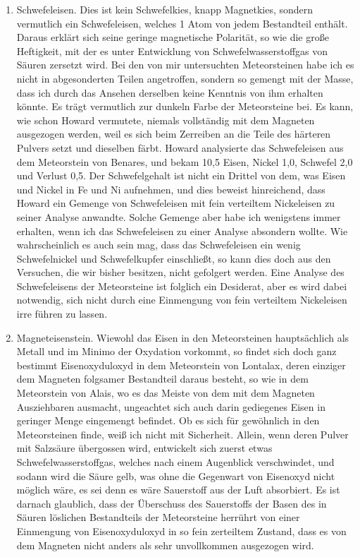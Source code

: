 \documentclass[a4paper, 11pt, oneside]{article}
\begin{document}
\begin{enumerate}
    \item Schwefeleisen. Dies ist kein Schwefelkies, knapp Magnetkies, sondern vermutlich ein Schwefeleisen, welches 1 Atom von jedem Bestandteil enthält. Daraus erklärt sich seine geringe magnetische Polarität, so wie die große Heftigkeit, mit der es unter Entwicklung von Schwefelwasserstoffgas von Säuren zersetzt wird. Bei den von mir untersuchten Meteorsteinen habe ich es nicht in abgesonderten Teilen angetroffen, sondern so gemengt mit der Masse, dass ich durch das Ansehen derselben keine Kenntnis von ihm erhalten könnte. Es trägt vermutlich zur dunkeln Farbe der Meteorsteine bei. Es kann, wie schon Howard vermutete, niemals vollständig mit dem Magneten ausgezogen werden, weil es sich beim Zerreiben an die Teile des härteren Pulvers setzt und dieselben färbt. Howard analysierte das Schwefeleisen aus dem Meteorstein von Benares, und bekam 10,5 Eisen, Nickel 1,0, Schwefel 2,0 und Verlust 0,5. Der Schwefelgehalt ist nicht ein Drittel von dem, was Eisen und Nickel in Fe und Ni aufnehmen, und dies beweist hinreichend, dass Howard ein Gemenge von Schwefeleisen mit fein verteiltem Nickeleisen zu seiner Analyse anwandte. Solche Gemenge aber habe ich wenigstens immer erhalten, wenn ich das Schwefeleisen zu einer Analyse absondern wollte. Wie wahrscheinlich es auch sein mag, dass das Schwefeleisen ein wenig Schwefelnickel und Schwefelkupfer einschließt, so kann dies doch aus den Versuchen, die wir bisher besitzen, nicht gefolgert werden. Eine Analyse des Schwefeleisens der Meteorsteine ist folglich ein Desiderat, aber es wird dabei notwendig, sich nicht durch eine Einmengung von fein verteiltem Nickeleisen irre führen zu lassen.
    \item Magneteisenstein. Wiewohl das Eisen in den Meteorsteinen hauptsächlich als Metall und im Minimo der Oxydation vorkommt, so findet sich doch ganz bestimmt Eisenoxyduloxyd in dem Meteorstein von Lontalax, deren einziger dem Magneten folgsamer Bestandteil daraus besteht, so wie in dem Meteorstein von Alais, wo es das Meiste von dem mit dem Magneten Ausziehbaren ausmacht, ungeachtet sich auch darin gediegenes Eisen in geringer Menge eingemengt befindet. Ob es sich für gewöhnlich in den Meteorsteinen finde, weiß ich nicht mit Sicherheit. Allein, wenn deren Pulver mit Salzsäure übergossen wird, entwickelt sich zuerst etwas Schwefelwasserstoffgas, welches nach einem Augenblick verschwindet, und sodann wird die Säure gelb, was ohne die Gegenwart von Eisenoxyd nicht möglich wäre, es sei denn es wäre Sauerstoff aus der Luft absorbiert. Es ist darnach glaublich, dass der Überschuss des Sauerstoffs der Basen des in Säuren löslichen Bestandteils der Meteorsteine herrührt von einer Einmengung von Eisenoxyduloxyd in so fein zerteiltem Zustand, dass es von dem Magneten nicht anders als sehr unvollkommen ausgezogen wird.

\end{enumerate}
\end{document}
